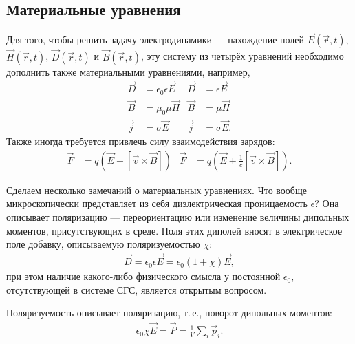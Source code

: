 \subsection{Материальные уравнения}
Для того, чтобы решить задачу электродинамики --- нахождение полей \(\vec{E}(\vec{r}, t)\), \(\vec{H}(\vec{r}, t)\), \(\vec{D}(\vec{r}, t)\) и \(\vec{B}(\vec{r}, t)\), эту систему из четырёх уравнений необходимо дополнить также материальными уравнениями, например,
\begin{align*}
	\vec{D} &= \epsilon_0\epsilon\vec{E} &
	\vec{D} &= \epsilon\vec{E} \\
	\vec{B} &= \mu_0\mu\vec{H} &
	\vec{B} &= \mu\vec{H} \\
	\vec{j} &= \sigma\vec{E} &
	\vec{j} &= \sigma\vec{E}.
\end{align*}
Также иногда требуется привлечь силу взаимодействия зарядов:
\begin{align*}
	\vec{F} &= q\left(\vec{E} + [\vec{v} \times \vec{B}]\right) & 
	\vec{F} &= q\left(\vec{E} + \frac{1}{c}[\vec{v} \times \vec{B}]\right).
\end{align*}

Сделаем несколько замечаний о материальных уравнениях. Что вообще микроскопически представляет из себя
диэлектрическая проницаемость \(\epsilon\)? Она описывает поляризацию --- переориентацию или изменение величины
 дипольных моментов, присутствующих в среде. Поля этих диполей вносят в
электрическое поле добавку, описываемую поляризуемостью \(\chi\):
\begin{align*}
	\vec{D} = \epsilon_0\epsilon \vec{E} = \epsilon_0(1 + \chi)\vec{E},
\end{align*}
при этом наличие какого-либо физического смысла у постоянной \(\epsilon_0\),
отсутствующей в системе СГС, является открытым вопросом.

Поляризуемость описывает поляризацию, т.\,е., поворот дипольных моментов:
\begin{align*}
	\epsilon_0 \chi \vec{E} = \vec{P} = \frac{1}{V}\sum_{i} \vec{p}_i.
\end{align*}

